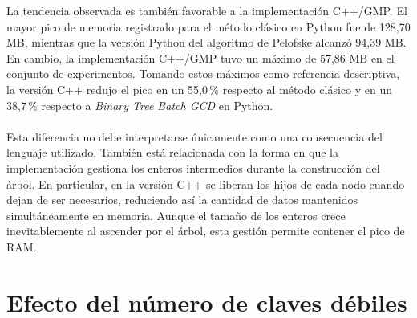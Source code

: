 La tendencia observada es también favorable a la implementación C++/GMP. El mayor pico de memoria registrado para el método clásico en Python fue de 128,70 MB, mientras que la versión Python del algoritmo de Pelofske alcanzó 94,39 MB. En cambio, la implementación C++/GMP tuvo un máximo de 57,86 MB en el conjunto de experimentos. Tomando estos máximos como referencia descriptiva, la versión C++ redujo el pico en un 55,0\,\% respecto al método clásico y en un 38,7\,\% respecto a \textit{Binary Tree Batch GCD} en Python.
\\
\\
Esta diferencia no debe interpretarse únicamente como una consecuencia del lenguaje utilizado. También está relacionada con la forma en que la implementación gestiona los enteros intermedios durante la construcción del árbol. En particular, en la versión C++ se liberan los hijos de cada nodo cuando dejan de ser necesarios, reduciendo así la cantidad de datos mantenidos simultáneamente en memoria. Aunque el tamaño de los enteros crece inevitablemente al ascender por el árbol, esta gestión permite contener el pico de RAM.

\section{Efecto del número de claves débiles}

